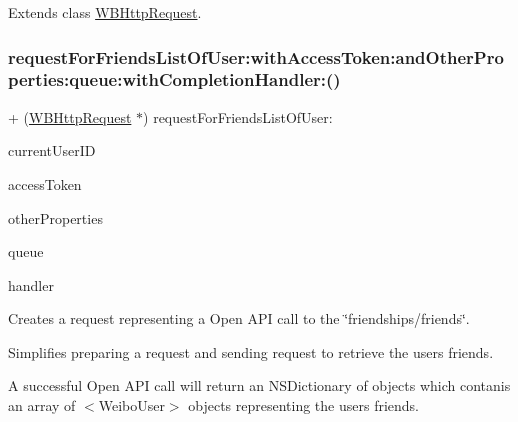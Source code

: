 Extends class \mbox{\hyperlink{interface_w_b_http_request_a6bec26ae942e00b30352846353c10f4d}{W\+B\+Http\+Request}}.

\mbox{\label{category_w_b_http_request_07_weibo_user_08_a6bec26ae942e00b30352846353c10f4d}} 
\subsubsection{\texorpdfstring{request\+For\+Friends\+List\+Of\+User\+:with\+Access\+Token\+:and\+Other\+Properties\+:queue\+:with\+Completion\+Handler\+:()}{requestForFriendsListOfUser:withAccessToken:andOtherProperties:queue:withCompletionHandler:()}\hspace{0.1cm}{\footnotesize\ttfamily [2/3]}}
{\footnotesize\ttfamily + (\mbox{\hyperlink{interface_w_b_http_request}{W\+B\+Http\+Request}} $\ast$) request\+For\+Friends\+List\+Of\+User\+: \begin{DoxyParamCaption}\item[{(N\+S\+String $\ast$)}]{current\+User\+ID }\item[{withAccessToken:(N\+S\+String $\ast$)}]{access\+Token }\item[{andOtherProperties:(N\+S\+Dictionary $\ast$)}]{other\+Properties }\item[{queue:(N\+S\+Operation\+Queue $\ast$)}]{queue }\item[{withCompletionHandler:(W\+B\+Request\+Handler)}]{handler }\end{DoxyParamCaption}}

Creates a request representing a Open A\+PI call to the \char`\"{}friendships/friends\char`\"{}.

Simplifies preparing a request and sending request to retrieve the user\textquotesingle{}s friends.

A successful Open A\+PI call will return an N\+S\+Dictionary of objects which contanis an array of $<$\+Weibo\+User$>$ objects representing the user\textquotesingle{}s friends.

